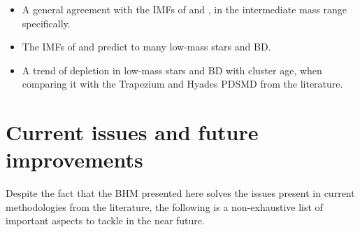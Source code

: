 \begin{itemize}
\begin{itemize}
\item A general agreement with the IMFs of \citet{Chabrier2005} and \citet{Thies2007}, in the intermediate mass range specifically.
\item The IMFs of \citet{Chabrier2005} and \citet{Thies2007} predict to many low-mass stars and BD.
\item A trend of depletion in low-mass stars and BD with cluster age, when comparing it with the Trapezium and Hyades PDSMD from the literature.
\end{itemize}
\end{itemize}

\section{Current issues and future improvements}

Despite the fact that the BHM presented here solves the issues present in current methodologies from the literature, the following is a non-exhaustive list of important aspects to tackle in the near future.

